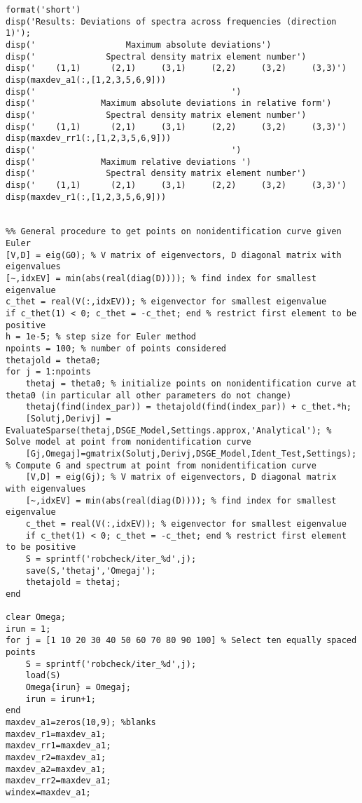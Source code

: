 \documentclass{article}
\begin{document}
\begin{verbatim}
format('short')
disp('Results: Deviations of spectra across frequencies (direction 1)');
disp('                  Maximum absolute deviations')
disp('              Spectral density matrix element number')
disp('    (1,1)      (2,1)     (3,1)     (2,2)     (3,2)     (3,3)')
disp(maxdev_a1(:,[1,2,3,5,6,9]))
disp('                                       ')
disp('             Maximum absolute deviations in relative form')
disp('              Spectral density matrix element number')
disp('    (1,1)      (2,1)     (3,1)     (2,2)     (3,2)     (3,3)')
disp(maxdev_rr1(:,[1,2,3,5,6,9]))
disp('                                       ')
disp('             Maximum relative deviations ')
disp('              Spectral density matrix element number')
disp('    (1,1)      (2,1)     (3,1)     (2,2)     (3,2)     (3,3)')
disp(maxdev_r1(:,[1,2,3,5,6,9]))


%% General procedure to get points on nonidentification curve given Euler
[V,D] = eig(G0); % V matrix of eigenvectors, D diagonal matrix with eigenvalues
[~,idxEV] = min(abs(real(diag(D)))); % find index for smallest eigenvalue
c_thet = real(V(:,idxEV)); % eigenvector for smallest eigenvalue
if c_thet(1) < 0; c_thet = -c_thet; end % restrict first element to be positive
h = 1e-5; % step size for Euler method
npoints = 100; % number of points considered
thetajold = theta0;
for j = 1:npoints
    thetaj = theta0; % initialize points on nonidentification curve at theta0 (in particular all other parameters do not change)
    thetaj(find(index_par)) = thetajold(find(index_par)) + c_thet.*h;
    [Solutj,Derivj] = EvaluateSparse(thetaj,DSGE_Model,Settings.approx,'Analytical'); % Solve model at point from nonidentification curve
    [Gj,Omegaj]=gmatrix(Solutj,Derivj,DSGE_Model,Ident_Test,Settings); % Compute G and spectrum at point from nonidentification curve
    [V,D] = eig(Gj); % V matrix of eigenvectors, D diagonal matrix with eigenvalues
    [~,idxEV] = min(abs(real(diag(D)))); % find index for smallest eigenvalue
    c_thet = real(V(:,idxEV)); % eigenvector for smallest eigenvalue
    if c_thet(1) < 0; c_thet = -c_thet; end % restrict first element to be positive
    S = sprintf('robcheck/iter_%d',j);
    save(S,'thetaj','Omegaj');
    thetajold = thetaj;
end

clear Omega;
irun = 1;
for j = [1 10 20 30 40 50 60 70 80 90 100] % Select ten equally spaced points
    S = sprintf('robcheck/iter_%d',j);
    load(S)
    Omega{irun} = Omegaj;
    irun = irun+1;
end
maxdev_a1=zeros(10,9); %blanks
maxdev_r1=maxdev_a1;
maxdev_rr1=maxdev_a1;
maxdev_r2=maxdev_a1;
maxdev_a2=maxdev_a1;
maxdev_rr2=maxdev_a1;
windex=maxdev_a1;


\end{verbatim}
\end{document}
